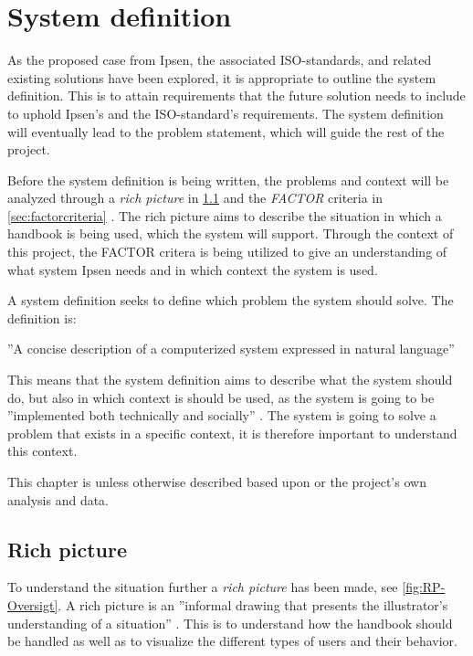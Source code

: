 \section{System definition}\label{sec:SystemDefinition}
As the proposed case from Ipsen, the associated ISO-standards, and related existing solutions have been explored, it is appropriate to outline the system definition.
This is to attain requirements that the future solution needs to include to uphold Ipsen's and the ISO-standard's requirements.
The system definition will eventually lead to the problem statement, which will guide the rest of the project.

Before the system definition is being written, the problems and context will be analyzed through a \textit{rich picture} in \cref{sec:richpictures} and the \textit{FACTOR} criteria in \cref{sec:factorcriteria} \citep{Rod-Aalborg}.
The rich picture aims to describe the situation in which a handbook is being used, which the system will support.
Through the context of this project, the FACTOR critera is being utilized to give an understanding of what system Ipsen needs and in which context the system is used.

A system definition seeks to define which problem the system should solve.
The definition is: \citep[p.~24]{Rod-Aalborg}

\begin{defn}
''A concise description of a computerized system expressed in natural language''
\end{defn}

This means that the system definition aims to describe what the system should do, but also in which context is should be used, as the system is going to be ''implemented both technically and socially'' \citep[p.~23]{Rod-Aalborg}.
The system is going to solve a problem that exists in a specific context, it is therefore important to understand this context.

This chapter is unless otherwise described based upon \cite{Rod-Aalborg} or the project's own analysis and data.

\subsection{Rich picture} \label{sec:richpictures}

To understand the situation further a \textit{rich picture} has been made, see \cref{fig:RP-Oversigt}. A rich picture is an ''informal drawing that presents the illustrator's understanding of a situation'' \citep[~p. 26]{Rod-Aalborg}.
This is to understand how the handbook should be handled as well as to visualize the different types of users and their behavior.

